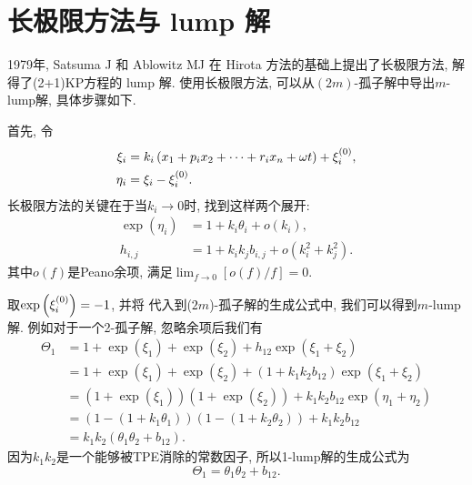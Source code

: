 \section{长极限方法与 lump 解}
1979年, Satsuma J 和 Ablowitz MJ \cite{satsuma1979two} 在 Hirota 方法的基础上提出了长极限方法, 解得了(2+1)KP方程\cite{kadomtsev1970stability}的 lump 解. 使用长极限方法, 可以从$(2m)$-孤子解中导出$m$-lump解, 具体步骤如下.

首先, 令
\begin{equation}
\begin{split}
    \xi_i&=k_i\left(x_1+p_ix_2+\cdots+r_ix_n+\omega t\right)+\xi_i^{(0)},\\
    \eta_i&=\xi_i-\xi_i^{(0)}.
\end{split}
\end{equation}
长极限方法的关键在于当$k_i\rightarrow 0$时, 找到这样两个展开:
\begin{equation}
\begin{split}
    \exp(\eta_i)&=1+k_i \theta_i+o(k_i), \\ 
    h_{i,j}&=1+k_ik_jb_{i,j}+o(k_i^2+k_j^2).
\end{split} \label{lump-expansion}
\end{equation}
其中$o(f)$是Peano余项, 满足$\lim_{f\rightarrow 0}[o(f)/f]=0$.

取$\exp\left(\xi_i^{(0)}\right)=-1$, 并将 代入到($2m$)-孤子解的生成公式中, 我们可以得到$m$-lump解. 例如对于一个2-孤子解, 忽略余项后我们有
\begin{equation}
\begin{split}
\Theta_1&=1+\exp(\xi_1)+\exp(\xi_2)+h_{12}\exp(\xi_1+\xi_2) \\ 
&= 1+\exp(\xi_1)+\exp(\xi_2)+(1+k_1k_2b_{12})\exp(\xi_1+\xi_2) \\ 
&=(1+\exp(\xi_1))(1+\exp(\xi_2))+k_1k_2b_{12}\exp(\eta_1+\eta_2) \\ 
&=(1-(1+k_1\theta_1))(1-(1+k_2\theta_2))+k_1k_2b_{12} \\
&=k_1k_2(\theta_1\theta_2+b_{12}).
\end{split}
\end{equation}
因为$k_1k_2$是一个能够被TPE消除的常数因子, 所以1-lump解的生成公式为
\begin{equation}
    \Theta_1=\theta_1\theta_2+b_{12}.
\end{equation}

